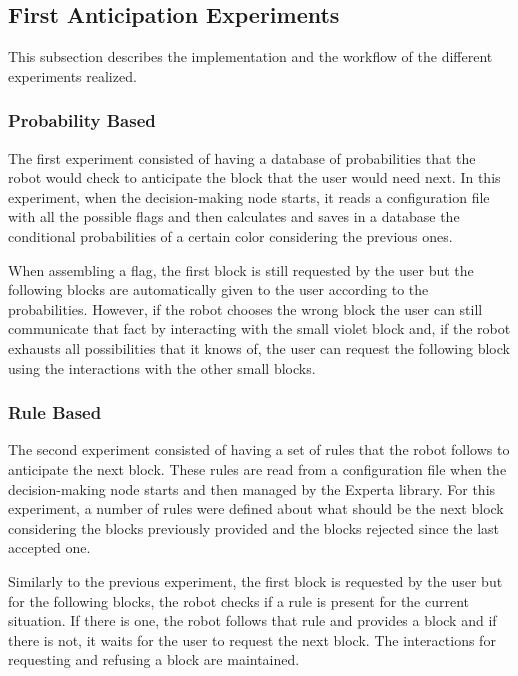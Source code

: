 \subsection{First Anticipation Experiments}
\label{subsection:first_anticipation_experiments}

This subsection describes the implementation and the workflow of the different experiments realized.

\subsubsection{Probability Based}

The first experiment consisted of having a database of probabilities that the robot would check to anticipate the block that the user would need next. In this experiment, when the decision-making node starts, it reads a configuration file with all the possible flags and then calculates and saves in a database the conditional probabilities of a certain color considering the previous ones.

When assembling a flag, the first block is still requested by the user but the following blocks are automatically given to the user according to the probabilities. However, if the robot chooses the wrong block the user can still communicate that fact by interacting with the small violet block and, if the robot exhausts all possibilities that it knows of, the user can request the following block using the interactions with the other small blocks.

\subsubsection{Rule Based}

The second experiment consisted of having a set of rules that the robot follows to anticipate the next block. These rules are read from a configuration file when the decision-making node starts and then managed by the Experta library. For this experiment, a number of rules were defined about what should be the next block considering the blocks previously provided and the blocks rejected since the last accepted one.

Similarly to the previous experiment, the first block is requested by the user but for the following blocks, the robot checks if a rule is present for the current situation. If there is one, the robot follows that rule and provides a block and if there is not, it waits for the user to request the next block. The interactions for requesting and refusing a block are maintained.

